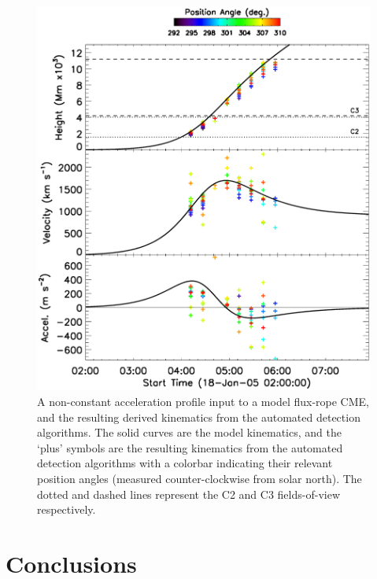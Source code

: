 \documentclass[preprint2]{aastex}
\begin{document}
\begin{figure}[!t]
\centerline{\includegraphics[scale=0.24]{figure_peak_accel.eps}}
\caption{A non-constant acceleration profile input to a model flux-rope CME, and the resulting derived kinematics from the automated detection algorithms. The solid curves are the model kinematics, and the `plus' symbols are the resulting kinematics from the automated detection algorithms with a colorbar indicating their relevant position angles (measured counter-clockwise from solar north). The dotted and dashed lines represent the C2 and C3 fields-of-view respectively.}
\label{figure_peak_accel}
\end{figure}

\section{Conclusions}
\label{sect_conclusions}
\end{document}

